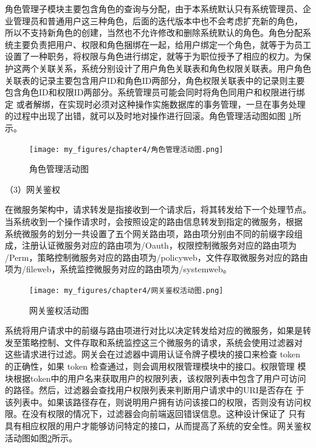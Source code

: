 角色管理子模块主要包含角色的查询与分配，由于本系统默认只有系统管理员、企业管理员和普通用户这三种角色，后面的迭代版本中也不会考虑扩充新的角色，
所以不支持新角色的创建，当然也不允许修改和删除系统默认的角色。角色分配系统主要负责把用户、权限和角色捆绑在一起，给用户绑定一个角色，就等于为员工
设置了一种职务，将权限与角色进行绑定，就等于为职位授予了相应的权力。为保护这两个关联关系，系统分别设计了用户角色关联表和角色权限关联表。用户角色
关联表的记录主要包含用户ID和角色ID两部分，角色权限关联表中的记录则主要包含角色ID和权限ID两部分。系统管理员可能会同时将角色同用户和权限进行绑定
或者解绑，在实现时必须对这种操作实施数据库的事务管理，一旦在事务处理的过程中出现了出错，就可以及时地对操作进行回滚。角色管理活动图如图
\ref{fig:角色管理活动图}所示。

\begin{figure}[h]
    \centering
    \texttt{[image: my\_figures/chapter4/角色管理活动图.png]}
    \caption{角色管理活动图}
    \label{fig:角色管理活动图}
\end{figure}

（3）网关鉴权

在微服务架构中，请求转发是指接收到一个请求后，将其转发给下一个处理节点。当系统收到一个操作请求时，会按照设定的路由信息转发到指定的微服务，根据
系统微服务的划分一共设置了五个网关路由项，路由项分别由不同的前缀字段组成，注册认证微服务对应的路由项为/Oauth，权限控制微服务对应的路由项为
/Perm，策略控制微服务对应的路由项为/policyweb，文件存取微服务对应的路由项为/fileweb，系统监控微服务对应的路由项为/systemweb。

\begin{figure}[h]
    \centering
    \texttt{[image: my\_figures/chapter4/网关鉴权活动图.png]}
    \caption{网关鉴权活动图}
    \label{fig:网关鉴权活动图}
\end{figure}

系统将用户请求中的前缀与路由项进行对比以决定转发给对应的微服务，如果是转发至策略控制、文件存取和系统监控这三个微服务的请求，系统会使用过滤器对
这些请求进行过滤。网关会在过滤器中调用认证令牌子模块的接口来检查 token 的正确性，如果 token 检查通过，则会调用权限管理模块中的接口。权限管理
模块根据token中的用户名来获取用户的权限列表，该权限列表中包含了用户可访问的路径。然后，过滤器会查找用户权限列表来判断用户请求中的URI是否存在
于该列表中。如果该路径存在，则说明用户拥有访问该接口的权限，否则没有访问权限。在没有权限的情况下，过滤器会向前端返回错误信息。这种设计保证了
只有具有相应权限的用户才能够访问特定的接口，从而提高了系统的安全性。网关鉴权活动图如图\ref{fig:网关鉴权活动图}所示。



